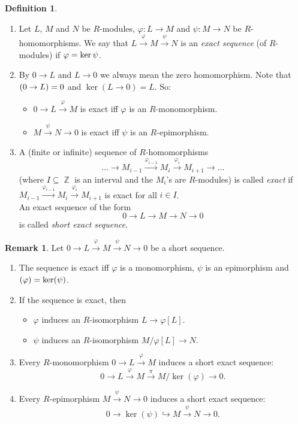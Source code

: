 \documentclass[12pt,a4paper]{report}
\theoremstyle{definition}
\newtheorem{defn}[theorem]{Definition}
\newtheorem*{remark}{Remark}
\theoremstyle{num.custom-title}
\let\o\relax %
\DeclareMathOperator{\o}{\mathsf{o}}
\let\Im\relax %
\DeclareMathOperator{\Im}{Im}
\DeclareMathOperator{\Z}{\mathbb{Z}}
\DeclareMathOperator{\sse}{\subseteq}
\renewcommand{\phi}{\varphi}
\begin{document}
\begin{defn}\ 
\begin{enumerate}
\item Let $L$, $M$ and $N$ be $R$-modules, $\phi : L \to M$ and $\psi : M \to N$ be $R$-homomorphisms. We say that $L \stackrel{\phi}{\to} M \stackrel{\psi}{\to} N$ is an \emph{exact sequence} (of $R$-modules) if $\Im \phi = \ker \psi$.
\item By $0 \to L$ and $L \to 0$ we always mean the zero homomorphism. Note that $\Im(0 \to L)=0$ and $\ker(L \to 0)=L$. So:
\begin{itemize}
\item $0 \to L \stackrel{\phi}{\to} M$ is exact iff $\phi$ is an $R$-monomorphism.
\item $M \stackrel{\psi}{\to} N \to 0$ is exact iff $\psi$ is an $R$-epimorphism.
\end{itemize}
\item A (finite or infinite) sequence of $R$-homomorphisms
\[
\ldots \to M_{i-1} \stackrel{\phi_{i-1}}{\to} M_i \stackrel{\phi_i}{\to} M_{i+1} \to \ldots
\]
(where $I \sse \Z$ is an interval and the $M_i$'s are $R$-modules) is called \emph{exact} if $M_{i-1} \stackrel{\phi_{i-1}}{\to} M_i \stackrel{\phi_i}{\to} M_{i+1}$ is exact for all $i \in I$.\\
An exact sequence of the form
\[
0 \to L \to M \to N \to 0
\]
is called \emph{short exact sequence}.
\end{enumerate}
\end{defn}

\begin{remark}
Let $0 \to L \stackrel{\phi}{\to} M \stackrel{\psi}{\to} N \to 0$ be a short sequence.
\begin{enumerate}
\item The sequence is exact iff $\phi$ is a monomorphism, $\psi$ is an epimorphism and $\Im(\phi) = \ker(\psi)$.
\item If the sequence is exact, then
\begin{itemize}
\item $\phi$ induces an $R$-isomorphism $L \to \phi[L]$.
\item $\psi$ induces an $R$-isomorphism $M/\phi[L] \to N$.
\end{itemize}
\item Every $R$-monomorphism $0 \to L \stackrel{\phi}{\to} M$ induces a short exact sequence:
\[
0 \to L \stackrel{\phi}{\to} M \stackrel{\pi}{\to} M/\ker(\phi) \to 0.
\]
\item Every $R$-epimorphism $M \stackrel{\psi}{\to} N \to 0$ induces a short exact sequence:
\[
0 \to \ker(\psi) \hookrightarrow M \stackrel{\psi}{\to} N \to 0.
\]
\end{enumerate}
\end{remark}
\end{document}
